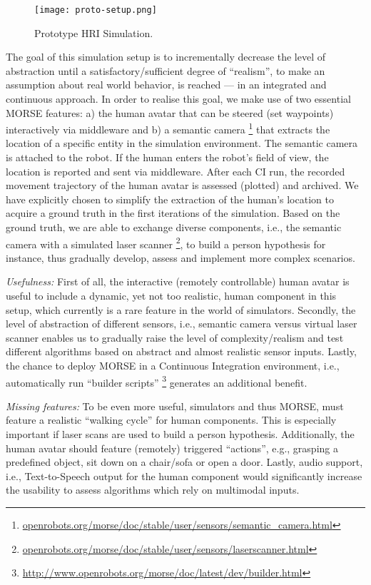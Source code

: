 \documentclass[conference]{IEEEtran}
\begin{document}
\begin{figure}[H]
      \centering
      \texttt{[image: proto-setup.png]}
      \caption{Prototype HRI Simulation.}
      \label{fig|proto}
\end{figure}

The goal of this simulation setup is to incrementally decrease the level of
abstraction until a satisfactory/sufficient degree of ``realism'', to make an
assumption about real world behavior, is reached --- in an integrated and
continuous approach. In order to realise this goal, we make use of two essential
MORSE features: a) the human avatar that can be steered (set waypoints)
interactively via middleware and b) a semantic camera
\footnote{\url{openrobots.org/morse/doc/stable/user/sensors/semantic_camera.html}}
that extracts the location of a specific entity in the simulation environment.
The semantic camera is attached to the robot. If the human enters the robot's
field of view, the location is reported and sent via middleware. After each CI
run, the recorded movement trajectory of the human avatar is assessed (plotted)
and archived. 
We have explicitly chosen to simplify the extraction of the
human's location to acquire a ground truth in the first iterations of the
simulation. Based on the ground truth, we are able to exchange diverse
components, i.e., the semantic camera with a simulated laser scanner
\footnote{\url{openrobots.org/morse/doc/stable/user/sensors/laserscanner.html}},
to build a person hypothesis for instance, thus gradually develop, assess and
implement more complex scenarios. 

\emph{Usefulness:} First of all, the interactive (remotely controllable) human avatar 
is useful to include a dynamic, yet not too realistic, human component in this 
setup, which currently is a rare feature in the world of simulators. Secondly, 
the level of abstraction of different sensors, i.e., semantic camera versus virtual 
laser scanner enables us to gradually raise the level of complexity/realism and 
test different algorithms based on abstract and almost realistic sensor inputs. 
Lastly, the chance to deploy MORSE in a Continuous Integration environment, i.e., 
automatically run ``builder scripts'' \footnote{\url{http://www.openrobots.org/morse/doc/latest/dev/builder.html}}
generates an additional benefit.
 
\emph{Missing features:} To be even more useful, simulators and thus MORSE, must
feature a realistic ``walking cycle'' for human components. This is especially
important if laser scans are used to build a person hypothesis. Additionally, the
human avatar should feature (remotely) triggered ``actions'', e.g., grasping a 
predefined object, sit down on a chair/sofa or open a door. Lastly, audio support, 
i.e., Text-to-Speech output for the human component would significantly increase
the usability to assess algorithms which rely on multimodal inputs.  
\end{document}
